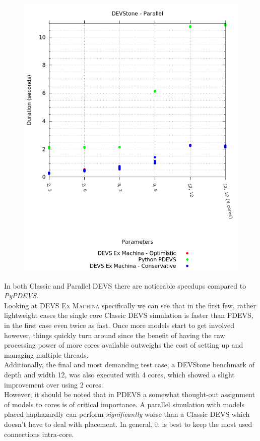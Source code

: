 \documentclass[8pt,a4paper]{report}
\begin{document}
\begin{figure}
\begin{minipage}{.5\textwidth}
  \includegraphics[width=1.6\linewidth]{devstone_parallel.png}
\end{minipage}
\end{figure}

In both Classic and Parallel DEVS there are noticeable speedups compared to \textit{PyPDEVS}.\\
Looking at \textsc{DEVS Ex Machina} specifically we can see that in the first few, rather lightweight cases the single core Classic DEVS simulation is faster than PDEVS, in the first case even twice as fast. Once more models start to get involved however, things quickly turn around since the benefit of having the raw processing power of more cores available outweighs the cost of setting up and managing multiple threads.\\
Additionally, the final and most demanding test case, a DEVStone benchmark of depth and width 12, was also executed with 4 cores, which showed a slight improvement over using 2 cores.
\\

However, it should be noted that in PDEVS a somewhat thought-out assignment of models to cores is of critical importance. A parallel simulation with models placed haphazardly can perform \emph{significantly} worse than a Classic DEVS which doesn't have to deal with placement. In general, it is best to keep the most used connections intra-core.
\end{document}
